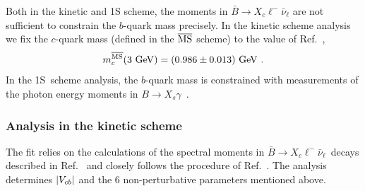 Both in the kinetic and 1S scheme, the moments in $\bar B\to
X_c\ell^-\bar\nu_\ell$ are not sufficient to constrain the $b$-quark
mass precisely. In the kinetic scheme analysis we fix the $c$-quark
mass (defined in the $\overline{\rm MS}$ scheme) to the value of
Ref.~\cite{Chetyrkin:2009fv},
\begin{equation}
  m_c^{\overline{\rm MS}}(3~{\rm GeV})=(0.986\pm 0.013)~{\rm GeV}~.
\end{equation}
In the 1S~scheme analysis, the $b$-quark mass is constrained with
measurements of the photon energy moments in $B\to
X_s\gamma$~\cite{Aubert:2005cua,Aubert:2006gg,Limosani:2009qg,Chen:2001fja}.

\subsubsection{Analysis in the kinetic scheme}
\label{globalfitsKinetic}

The fit relies on the calculations of the spectral moments in $\bar
B\to X_c\ell^-\bar\nu_\ell$~decays described in
Ref.~\cite{Gambino:2011cq} and closely follows the procedure of
Ref.~\cite{Gambino:2013rza}. The analysis determines $|V_{cb}|$ and the 6
non-perturbative parameters mentioned above.

